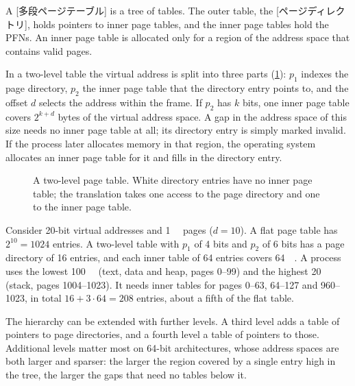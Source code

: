 \documentclass[../main.tex]{subfiles}
\begin{document}
\begin{definition}
  A [多段ページテーブル] is a tree of tables.
  The outer table, the [ページディレクトリ], holds
  pointers to inner page tables, and the inner page tables hold the PFNs.
  An inner page table is allocated only for a region of the address space
  that contains valid pages.
\end{definition}

In a two-level table the virtual address is split into three parts
(\cref{fig:l08-multilevel}): $p_1$ indexes the page directory, $p_2$ the
inner page table that the directory entry points to, and the offset $d$
selects the address within the frame.  If $p_2$ has $k$ bits, one inner
page table covers $2^{k+d}$ bytes of the virtual address space.  A gap in
the address space of this size needs no inner page table at all; its
directory entry is simply marked invalid.  If the process later allocates
memory in that region, the operating system allocates an inner page table
for it and fills in the directory entry.

\begin{figure}[htbp]
  \centering
  
  \caption{A two-level page table.  White directory entries have no inner
    page table; the translation takes one access to the page directory and
    one to the inner page table.}
  \label{fig:l08-multilevel}
\end{figure}

\begin{example}
  \label{ex:l08-multilevel}
  Consider 20-bit virtual addresses and \SI{1}{\kibi\byte} pages ($d =
  10$).  A flat page table has $2^{10} = 1024$ entries.  A two-level table
  with $p_1$ of 4 bits and $p_2$ of 6 bits has a page directory of 16
  entries, and each inner table of 64 entries covers \SI{64}{\kibi\byte}.  A
  process uses the lowest \SI{100}{\kibi\byte} (text, data and heap, pages
  0--99) and the highest \SI{20}{\kibi\byte} (stack, pages 1004--1023).  It
  needs inner tables for pages 0--63, 64--127 and 960--1023, in total $16 +
  3 \cdot 64 = 208$ entries, about a fifth of the flat table.
\end{example}

The hierarchy can be extended with further levels.  A third level adds a
table of pointers to page directories, and a fourth level a table of
pointers to those.  Additional levels matter
most on 64-bit architectures, whose address spaces are both larger and
sparser: the larger the region covered by a single entry high in the tree,
the larger the gaps that need no tables below it.
\end{document}
